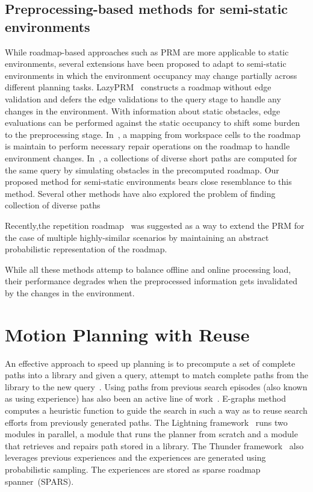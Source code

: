 \documentclass[a4paper]{report}
\begin{document}
\subsection{Preprocessing-based methods for semi-static environments}
While roadmap-based approaches such as PRM are more applicable to static environments, several extensions have been proposed to adapt to semi-static environments in which the environment occupancy may change partially across different planning tasks. LazyPRM~\cite{kavraki2000path} constructs a roadmap without edge validation and defers the edge validations to the query stage to handle any changes in the environment. With information about static obstacles, edge evaluations can be performed against the static occupancy to shift some burden to the preprocessing stage.
In~\cite{leven2002framework}, a mapping from workspace cells to the roadmap is maintain to perform necessary repair operations on the roadmap to handle environment changes.
In~\cite{voss2015heuristic}, a collections of diverse short paths are computed for the same query by simulating obstacles in the precomputed roadmap. Our proposed method for semi-static environments bears close resemblance to this method. Several other methods have also explored the problem of finding collection of diverse paths~\cite{palmieri2016fast, liu2017finding, vadlamudi2016combinatorial}

Recently,the repetition roadmap~\cite{LA18} was suggested as a way to extend the PRM for the case of multiple highly-similar scenarios by maintaining an abstract probabilistic representation of the roadmap.

While all these methods attemp to balance offline and online processing load, their performance degrades when the preprocessed information gets invalidated by the changes in the environment.


\section{Motion Planning with Reuse}
An effective approach to speed up planning is to precompute a set of complete paths into a library and given a query, attempt to match complete paths from the library to the new query~\cite{berenson2012robot,jetchev2013fast}.
Using paths from previous search episodes (also known as using experience) has also been an active line of work~\cite{PCCL12,PDCL13,BAG12,CSMOC15}. E-graphs method~\cite{PCCL12} computes a heuristic function to guide the search in such a way as to reuse search efforts from previously generated paths. The Lightning framework~\cite{BAG12} runs two modules in parallel, a module that runs the planner from scratch and a module that retrieves and repairs path stored in a library. The Thunder framework~\cite{CSMOC15} also leverages previous experiences and the experiences are generated using probabilistic sampling. The experiences are stored as sparse roadmap spanner~(SPARS). 
\end{document}
